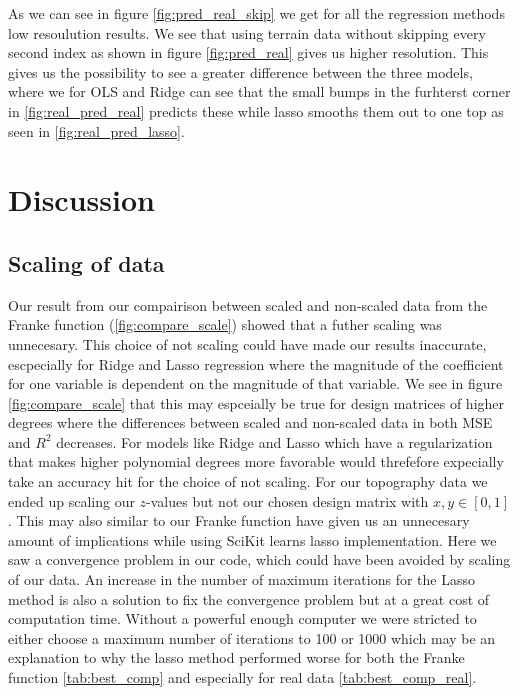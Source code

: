 \documentclass[12pt]{article}
\begin{document}
As we can see in figure \ref{fig:pred_real_skip} we get for all the regression methods low resoulution results. We see that using terrain data without skipping every second index as shown in figure \ref{fig:pred_real} gives us higher resolution. This gives us the possibility to see a greater difference between the three models, where we for OLS and Ridge can see that the small bumps in the furhterst corner in \ref{fig:real_pred_real} predicts these while lasso smooths them out to one top as seen in \ref{fig:real_pred_lasso}.
\section{Discussion}
\subsection{Scaling of data}
Our result from our compairison between scaled and non-scaled data from the Franke function (\ref{fig:compare_scale}) showed that a futher scaling was unnecesary. This choice of not scaling could have made our results inaccurate, escpecially for Ridge and Lasso regression where the magnitude of the coefficient for one variable is dependent on the magnitude of that variable. We see in figure \ref{fig:compare_scale} that this may espceially be true for design matrices of higher degrees where the differences between scaled and non-scaled data in both MSE and $R^2$ decreases. For models like Ridge and Lasso which have a regularization that makes higher polynomial degrees more favorable would threfefore expecially take an accuracy hit for the choice of not scaling. For our topography data we ended up scaling our $z$-values but not our chosen design matrix with $x,y\in [0,1]$. This may also similar to our Franke function have given us an unnecesary amount of implications while using SciKit learns lasso implementation. Here we saw a convergence problem in our code, which could have been avoided by scaling of our data. An increase in the number of maximum iterations for the Lasso method is also a solution to fix the convergence problem but at a great cost of computation time. Without a powerful enough computer we were stricted to either choose a maximum number of iterations to 100 or 1000 which may be an explanation to why the lasso method performed worse for both the Franke function \ref{tab:best_comp} and especially for real data \ref{tab:best_comp_real}.
\end{document}
